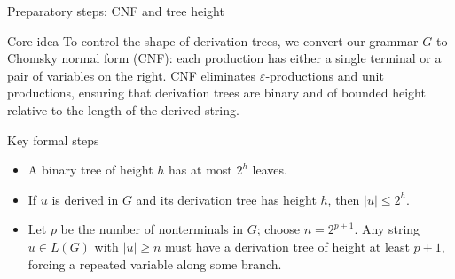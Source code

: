 \begin{frame}[t]{Preparatory steps: CNF and tree height}
  \begin{tblock}{Core idea}
    To control the shape of derivation trees, we convert our grammar $G$
    to Chomsky normal form (CNF): each production has either a single
    terminal or a pair of variables on the right.  CNF eliminates
    $\varepsilon$‑productions and unit productions, ensuring that
    derivation trees are binary and of bounded height relative to the
    length of the derived string.
  \end{tblock}
  \begin{tblock}{Key formal steps}
    \begin{itemize}
      \item A binary tree of height $h$ has at most $2^h$ leaves.
      \item If $u$ is derived in $G$ and its derivation tree has height
        $h$, then $|u| \le 2^h$.
      \item Let $p$ be the number of nonterminals in $G$; choose
        $n = 2^{p+1}$.  Any string $u \in L(G)$ with $|u| \ge n$ must
        have a derivation tree of height at least $p+1$, forcing a
        repeated variable along some branch.
    \end{itemize}
  \end{tblock}
  \label{fr:6.1-04}
\end{frame}

